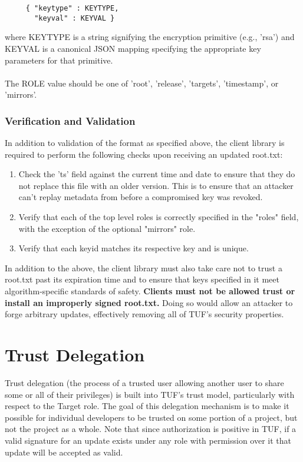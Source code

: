 \documentclass{article}
\begin{document}
\begin{verbatim}
     { "keytype" : KEYTYPE,
       "keyval" : KEYVAL }
\end{verbatim}

where KEYTYPE is a string signifying the encryption primitive (e.g., 'rsa') and
KEYVAL is a canonical JSON mapping specifying the appropriate key parameters for
that primitive.
\\\\
The ROLE value should be one of 'root', 'release', 'targets', 'timestamp', or
'mirrors'.

\subsubsection{Verification and Validation}
In addition to validation of the format as specified above, the client library 
is required to perform the following checks upon receiving an updated root.txt:

\begin{enumerate}
        \item Check the 'ts' field against the current time and date
                to ensure that they do not replace this file with an older version.
                This is to ensure that an attacker can't replay metadata from
                before a compromised key was revoked.
        \item Verify that each of the top level roles is correctly 
                specified in the "roles" field, with the exception of the 
                optional "mirrors" role.
        \item Verify that each keyid matches its respective key and is unique.
\end{enumerate}

In addition to the above, the client library must also take care not to trust a root.txt past 
its expiration time and to ensure that keys specified in it meet algorithm-specific
standards of safety. \textbf{Clients must not be allowed trust or install an improperly signed root.txt.}
Doing so would allow an attacker to forge arbitrary updates, effectively removing
all of TUF's security properties.

\section{Trust Delegation}
Trust delegation (the process of a trusted user allowing another user to share
some or all of their privileges) is built into TUF's trust model, particularly
with respect to the Target role. The goal of this delegation mechanism is to
make it possible for individual developers to be trusted on some portion of a
project, but not the project as a whole. Note that since authorization is positive
in TUF, if a valid signature for an update exists under any role with permission 
over it that update will be accepted as valid.
\end{document}
